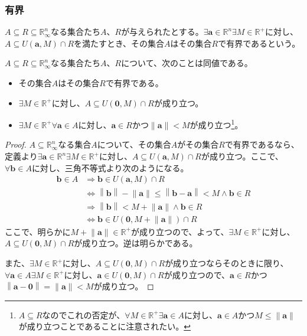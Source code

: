 \documentclass[dvipdfmx]{jsarticle}
\begin{document}
\subsubsection{有界}%
\begin{dfn}
$A \subseteq R \subseteq \mathbb{R}_{\infty}^{n}$なる集合たち$A$、$R$が与えられたとする。$\exists\mathbf{a} \in \mathbb{R}^{n}\exists M \in \mathbb{R}^{+}$に対し、$A \subseteq U\left( \mathbf{a},M \right) \cap R$を満たすとき、その集合$A$はその集合$R$で有界であるという。
\end{dfn}
\begin{thm}\label{4.1.3.7}
$A \subseteq R \subseteq \mathbb{R}_{\infty}^{n}$なる集合たち$A$、$R$について、次のことは同値である。
\begin{itemize}
\item
  その集合$A$はその集合$R$で有界である。
\item
  $\exists M \in \mathbb{R}^{+}$に対し、$A \subseteq U\left( \mathbf{0},M \right) \cap R$が成り立つ。
\item
  $\exists M \in \mathbb{R}^{+}\forall\mathbf{a} \in A$に対し、$\mathbf{a} \in R$かつ$\left\| \mathbf{a} \right\| < M$が成り立つ\footnote{$A \subseteq R$なのでこれの否定が、$\forall M \in \mathbb{R}^{+}\exists\mathbf{a} \in A$に対し、$\mathbf{a} \in A$かつ$M \leq \left\| \mathbf{a} \right\|$が成り立つことであることに注意されたい。}。
\end{itemize}
\end{thm}
\begin{proof}
$A \subseteq \mathbb{R}_{\infty}^{n}$なる集合$A$について、その集合$A$がその集合$R$で有界であるなら、定義より$\exists\mathbf{a} \in \mathbb{R}^{n}\exists M \in \mathbb{R}^{+}$に対し、$A \subseteq U\left( \mathbf{a},M \right) \cap R$が成り立つ。ここで、$\forall\mathbf{b} \in A$に対し、三角不等式より次のようになる。
\begin{align*}
\mathbf{b} \in A &\Rightarrow \mathbf{b} \in U\left( \mathbf{a},M \right) \cap R\\
&\Leftrightarrow \left\| \mathbf{b} \right\| - \left\| \mathbf{a} \right\| \leq \left\| \mathbf{b} - \mathbf{a} \right\| < M \land \mathbf{b} \in R\\
&\Rightarrow \left\| \mathbf{b} \right\| < M + \left\| \mathbf{a} \right\| \land \mathbf{b} \in R\\
&\Leftrightarrow \mathbf{b} \in U\left( \mathbf{0},M + \left\| \mathbf{a} \right\| \right) \cap R
\end{align*}
ここで、明らかに$M + \left\| \mathbf{a} \right\| \in \mathbb{R}^{+}$が成り立つので、よって、$\exists M \in \mathbb{R}^{+}$に対し、$A \subseteq U\left( \mathbf{0},M \right) \cap R$が成り立つ。逆は明らかである。\par
また、$\exists M \in \mathbb{R}^{+}$に対し、$A \subseteq U\left( \mathbf{0},M \right) \cap R$が成り立つならそのときに限り、$\forall\mathbf{a} \in A\exists M \in \mathbb{R}^{+}$に対し、$\mathbf{a} \in U\left( \mathbf{0},M \right) \cap R$が成り立つので、$\mathbf{a} \in R$かつ$\left\| \mathbf{a - 0} \right\| = \left\| \mathbf{a} \right\| < M$が成り立つ。
\end{proof}
\end{document}
